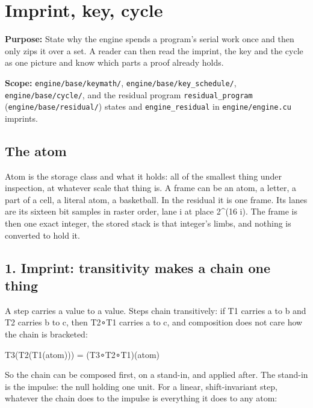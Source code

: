 \chapter{\texorpdfstring{Imprint, key, cycle}{Imprint, key, cycle}}
\label{chap:imprint-key-cycle}

\textbf{Purpose:} State why the engine spends a program's serial work once and then only zips it over a set. A reader can then read the imprint, the key and the cycle as one picture and know which parts a proof already holds.

\textbf{Scope:} \texttt{engine/\allowbreak{}base/\allowbreak{}keymath/\allowbreak{}}, \texttt{engine/\allowbreak{}base/\allowbreak{}key\_\allowbreak{}schedule/\allowbreak{}}, \texttt{engine/\allowbreak{}base/\allowbreak{}cycle/\allowbreak{}}, and the residual program \texttt{residual\_\allowbreak{}program} (\texttt{engine/\allowbreak{}base/\allowbreak{}residual/\allowbreak{}}) states and \texttt{engine\_\allowbreak{}residual} in \texttt{engine/\allowbreak{}engine.\allowbreak{}cu} imprints.

\section{\texorpdfstring{The atom}{The atom}}

Atom is the storage class and what it holds: all of the smallest thing under inspection, at whatever scale that thing is. A frame can be an atom, a letter, a part of a cell, a literal atom, a basketball. In the residual it is one frame. Its lanes are its sixteen bit samples in raster order, lane i at place 2\textasciicircum{}(16 i). The frame is then one exact integer, the stored stack is that integer's limbs, and nothing is converted to hold it.

\section{\texorpdfstring{1. Imprint: transitivity makes a chain one thing}{1. Imprint: transitivity makes a chain one thing}}

A step carries a value to a value. Steps chain transitively: if T1 carries a to b and T2 carries b to c, then T2∘T1 carries a to c, and composition does not care how the chain is bracketed:

T3(T2(T1(atom))) = (T3∘T2∘T1)(atom)

So the chain can be composed first, on a stand-in, and applied after. The stand-in is the impulse: the null holding one unit. For a linear, shift-invariant step, whatever the chain does to the impulse is everything it does to any atom:

